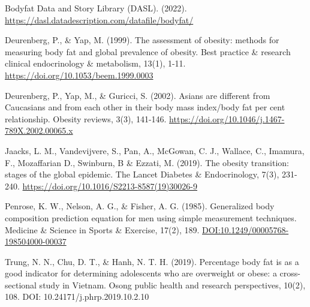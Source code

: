 \documentclass[letterpaper,9pt,twocolumn,twoside,]{pinp}
\begin{document}
Bodyfat Data and Story Library (DASL). (2022).
\url{https://dasl.datadescription.com/datafile/bodyfat/}

Deurenberg, P., \& Yap, M. (1999). The assessment of obesity: methods
for measuring body fat and global prevalence of obesity. Best practice
\& research clinical endocrinology \& metabolism, 13(1), 1-11.
\url{https://doi.org/10.1053/beem.1999.0003}

Deurenberg, P., Yap, M., \& Guricci, S. (2002). Asians are different
from Caucasians and from each other in their body mass index/body fat
per cent relationship. Obesity reviews, 3(3), 141-146.
\url{https://doi.org/10.1046/j.1467-789X.2002.00065.x}

Jaacks, L. M., Vandevijvere, S., Pan, A., McGowan, C. J., Wallace, C.,
Imamura, F., Mozaffarian D., Swinburn, B \& Ezzati, M. (2019). The
obesity transition: stages of the global epidemic. The Lancet Diabetes
\& Endocrinology, 7(3), 231-240.
\url{https://doi.org/10.1016/S2213-8587(19)30026-9}

Penrose, K. W., Nelson, A. G., \& Fisher, A. G. (1985). Generalized body
composition prediction equation for men using simple measurement
techniques. Medicine \& Science in Sports \& Exercise, 17(2), 189.
\url{DOI:10.1249/00005768-198504000-00037}

Trung, N. N., Chu, D. T., \& Hanh, N. T. H. (2019). Percentage body fat
is as a good indicator for determining adolescents who are overweight or
obese: a cross-sectional study in Vietnam. Osong public health and
research perspectives, 10(2), 108. DOI: 10.24171/j.phrp.2019.10.2.10

\showacknow




\end{document}

